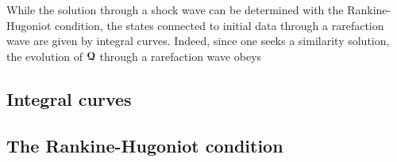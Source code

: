 
While the solution through a shock wave can be determined with the Rankine-Hugoniot condition, the states connected to initial data through a rarefaction wave are given by integral curves. Indeed, since one seeks a similarity solution, the evolution of ${\boldsymbol{\mathcal{Q}}}$ through a rarefaction wave obeys

\subsection{Integral curves}
\subsection{The Rankine-Hugoniot condition}



